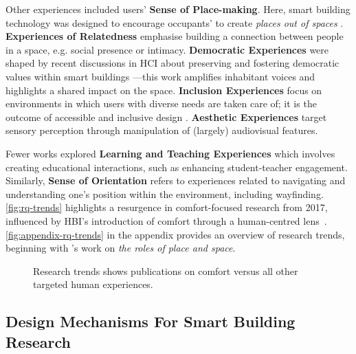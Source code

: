 Other experiences included users' \textbf{Sense of Place-making}. Here, smart building technology was designed to encourage occupants' to create \emph{places out of spaces} \cite{harrison1996re}. \textbf{Experiences of Relatedness} emphasise building a connection between people in a space, e.g. social presence or intimacy. \textbf{Democratic Experiences} were shaped by recent discussions in HCI about preserving and fostering democratic values within smart buildings \cite{dalton2020habitech}---this work amplifies inhabitant voices and highlights a shared impact on the space. \textbf{Inclusion Experiences} focus on environments in which users with diverse needs are taken care of; it is the outcome of accessible and inclusive design \cite{renel2018auraldiversity}. \textbf{Aesthetic Experiences} target sensory perception through manipulation of (largely) audiovisual features. 

Fewer works explored \textbf{Learning and Teaching Experiences} which involves creating educational interactions, such as enhancing student-teacher engagement. Similarly, \textbf{Sense of Orientation} refers to experiences related to navigating and understanding one's position within the environment, including wayfinding. \autoref{fig:rq-trends} highlights a resurgence in comfort-focused research from 2017, influenced by HBI's introduction of comfort through a human-centred lens~\cite{alavi2017comfort}. \autoref{fig:appendix-rq-trends} in the appendix provides an overview of research trends, beginning with \citet{harrison1996re}'s work on \emph{the roles of place and space}.

\begin{figure}[t]
    \centering
    
    \caption{Research trends shows publications on comfort versus all other targeted human experiences.}
    \label{fig:rq-trends}
\end{figure}

\subsection{Design Mechanisms For Smart Building Research}
\label{sec-ch2:findings-design-mechanisms}

\begingroup
\fontsize{6.8}{8.1}\selectfont
\setlength{\tabcolsep}{2.1pt}
\renewcommand{\arraystretch}{1.04}
\setlength{\LTleft}{0pt}
\setlength{\LTright}{0pt}

